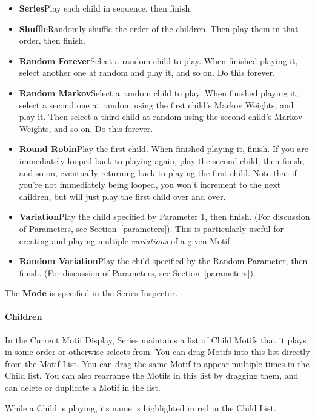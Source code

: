 \documentclass[twoside,10pt]{article}
\begin{document}
\begin{itemize}
\item{\bf Series}\quad Play each child in sequence, then finish.
\item{\bf Shuffle}\quad Randomly shuffle the order of the children.  Then play them in that order, then finish.
\item{\bf Random Forever}\quad Select a random child to play.  When finished playing it, select another one at random and play it, and so on.  Do this forever.  
\item{\bf Random Markov}\quad Select a random child to play.  When finished playing it, select a second one at random using the first child's Markov Weights, and play it.  Then select a third child at random using the second child's Markov Weights, and so on.  Do this forever.
\item{\bf Round Robin}\quad Play the first child.  When finished playing it, finish.  If you are immediately looped back to playing again, play the second child, then finish, and so on, eventually returning back to playing the first child.  Note that if you're not immediately being looped, you won't increment to the next children, but will just play the first child over and over.
\item{\bf Variation}\quad Play the child specified by Parameter 1, then finish. (For discussion of Parameters, see Section~\ref{parameters}).  This is particularly useful for creating and playing multiple {\it variations} of a given Motif.
\item{\bf Random Variation}\quad Play the child specified by the Random Parameter, then finish. (For discussion of Parameters, see Section~\ref{parameters}).
\end{itemize}

The {\bf Mode} is specified in the Series Inspector.

\paragraph{Children}

In the Current Motif Display, Series maintains a list of Child Motifs that it plays in some order or otherwise selects from.  You can drag Motifs into this list directly from the Motif List.  You can drag the same Motif to appear multiple times in the Child list.  You can also rearrange the Motifs in this list by dragging them, and can delete or duplicate a Motif in the list.

While a Child is playing, its name is highlighted in red in the Child List.
\end{document}
